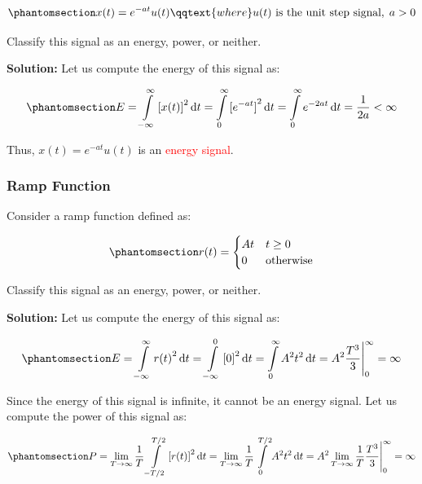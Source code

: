 \documentclass[
  14pt,
  a4paper,
  oneside,
  open=any,
  a4paper,
  14pt]{report}
\begin{document}
\begin{equation}\phantomsection\label{eq-exp-function-example}{
    x(t) = e^{-at}u(t)\qqtext{where} u(t) \text{ is the unit step signal}, \; a > 0 
}\end{equation}

Classify this signal as an energy, power, or neither.

\textbf{Solution:} Let us compute the energy of this signal as:

\begin{equation}\phantomsection\label{eq-exp-function-energy}{
    E = \int\limits_{-\infty}^{\infty} {[x(t)]}^2  \odif{t} = \int\limits_{0}^{\infty} {[e^{-at}]}^2 \odif{t} = \int\limits_{0}^{\infty} e^{-2at} \odif{t} = \dfrac{1}{2a} < \infty 
}\end{equation}

Thus, \(x(t) = e^{-at} u(t)\) is an \textcolor{red}{energy signal}.

\subsubsection{Ramp Function}\label{ramp-function}

Consider a ramp function defined as:

\begin{equation}\phantomsection\label{eq-ramp-function-example}{
    r(t) = 
    \begin{cases}         
        At & t \geq 0         \\         
        0  & \text{otherwise}     
    \end{cases} 
}\end{equation}

Classify this signal as an energy, power, or neither.

\textbf{Solution:} Let us compute the energy of this signal as:

\begin{equation}\phantomsection\label{eq-ramp-function-energy}{
    E = \int\limits_{-\infty}^{\infty} {r(t)}^2 \odif{t} = \int\limits_{-\infty}^{0} {[0]}^2 \odif{t} = \int\limits_{0}^{\infty} A^2 t^2 \odif{t} = A^2 \dfrac{T^3}{3} \Bigg|_{0}^{\infty} = \infty 
}\end{equation}

Since the energy of this signal is infinite, it cannot be an energy
signal. Let us compute the power of this signal as:

\begin{equation}\phantomsection\label{eq-ramp-function-power}{
    P = \lim\limits_{T \to \infty} \dfrac{1}{T} \int\limits_{-T/2}^{T/2} {[r(t)]}^2 \odif{t} = \lim\limits_{T \to \infty} \dfrac{1}{T} \int\limits_{0}^{T/2} A^2 t^2 \odif{t} = A^2 \lim\limits_{T \to \infty} \dfrac{1}{T} \dfrac{T^3}{3} \Bigg|_{0}^{\infty} = \infty 
}\end{equation}
\end{document}
